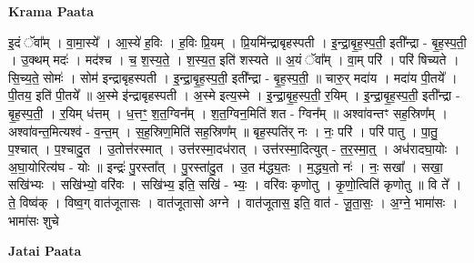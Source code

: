 \documentclass[17pt]{extarticle}
\begin{document}
\textbf{Krama Paata} \newline

इ॒दं ॅवा᳚म् । वा॒मा॒स्ये᳚ । आ॒स्ये॑ ह॒विः । ह॒विः प्रि॒यम् । प्रि॒यमि॑न्द्राबृहस्पती । इ॒न्द्रा॒बृ॒ह॒स्प॒ती॒ इती᳚न्द्रा - बृ॒ह॒स्प॒ती॒ । उ॒क्थम् मदः॑ । मद॑श्च । च॒ श॒स्य॒ते॒ । श॒स्य॒त॒ इति॑ शस्यते ॥ अ॒यं ॅवा᳚म् । वा॒म् परि॑ । 
परि॑ षिच्यते । सि॒च्य॒ते॒ सोमः॑ । सोम॑ इन्द्राबृहस्पती । इ॒न्द्रा॒बृ॒ह॒स्प॒ती॒ इती᳚न्द्रा - बृ॒ह॒स्प॒ती॒ ॥ चारु॒र् मदा॑य । मदा॑य पी॒तये᳚ । पी॒तय॒ इति॑ पी॒तये᳚ ॥ अ॒स्मे इ॑न्द्राबृहस्पती । अ॒स्मे इत्य॒स्मे । इ॒न्द्रा॒बृ॒ह॒स्प॒ती॒ र॒यिम् । इ॒न्द्रा॒बृ॒ह॒स्प॒ती॒ इती᳚न्द्रा - बृ॒ह॒स्प॒ती॒ । र॒यिम् ध॑त्तम् । ध॒त्तꣳ॒॒ श॒त॒ग्विन᳚म् । श॒त॒ग्विन॒मिति॑ शत - ग्विन᳚म् ॥ अश्वा॑वन्तꣳ सह॒स्रिण᳚म् । अश्वा॑वन्त॒मित्यश्व॑ - व॒न्त॒म् । स॒ह॒स्रिण॒मिति॑ सह॒स्रिण᳚म् ॥ बृह॒स्पति॑र् नः । नः॒ परि॑ । परि॑ पातु । पा॒तु॒ प॒श्चात् । प॒श्चादु॒त । उ॒तोत्त॑रस्मात् । उत्त॑रस्मा॒दध॑रात् । उत्त॑रस्मा॒दित्युत् - त॒र॒स्मा॒त्॒ । अध॑रादघा॒योः । अ॒घा॒योरित्य॑घ - योः ॥ इन्द्रः॑ पु॒रस्ता᳚त् । पु॒रस्ता॑दु॒त । उ॒त म॑द्ध्य॒तः । म॒द्ध्य॒तो नः॑ । नः॒ सखा᳚ । सखा॒ सखि॑भ्यः । सखि॑भ्यो॒ वरि॑वः । सखि॑भ्य॒ इति॒ सखि॑ - भ्यः॒ । वरि॑वः कृणोतु । कृ॒णो॒त्विति॑ कृणोतु ॥ वि ते᳚ । ते॒ विष्व॑क् । विष्व॒ग् वात॑जूतासः । वात॑जूतासो अग्ने । वात॑जूतास॒ इति॒ वात॑ - जू॒ता॒सः॒ । अ॒ग्ने॒ भामा॑सः । भामा॑सः शुचे \newline

\textbf{Jatai Paata} \newline
\end{document}
